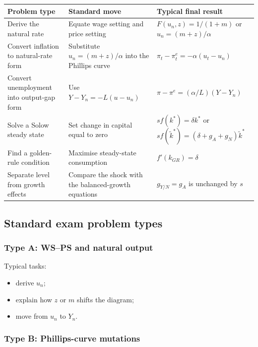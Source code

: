 \documentclass[12pt]{article}
\begin{document}
\begin{center}
\renewcommand{\arraystretch}{1.2}
\begin{tabularx}{\textwidth}{|p{3.3cm}|X|X|}
\hline
\textbf{Problem type} & \textbf{Standard move} & \textbf{Typical final result} \\
\hline
Derive the natural rate & Equate wage setting and price setting & \(F(u_n,z)=1/(1+m)\) or \(u_n=(m+z)/\alpha\) \\
\hline
Convert inflation to natural-rate form & Substitute \(u_n=(m+z)/\alpha\) into the Phillips curve & \(\pi_t-\pi_t^e=-\alpha(u_t-u_n)\) \\
\hline
Convert unemployment into output-gap form & Use \(Y-Y_n=-L(u-u_n)\) & \(\pi-\pi^e=(\alpha/L)(Y-Y_n)\) \\
\hline
Solve a Solow steady state & Set change in capital equal to zero & \(s f(k^*)=\delta k^*\) or \(s f(\tilde{k}^*)=(\delta+g_A+g_N)\tilde{k}^*\) \\
\hline
Find a golden-rule condition & Maximise steady-state consumption & \(f'(k_{GR})=\delta\) \\
\hline
Separate level from growth effects & Compare the shock with the balanced-growth equations & \(g_{Y/N}=g_A\) is unchanged by \(s\) \\
\hline
\end{tabularx}
\end{center}

\subsection{Standard exam problem types}

\subsubsection*{Type A: WS--PS and natural output}

Typical tasks:
\begin{itemize}[leftmargin=1.5em]
\item derive \(u_n\);
\item explain how \(z\) or \(m\) shifts the diagram;
\item move from \(u_n\) to \(Y_n\).
\end{itemize}

\subsubsection*{Type B: Phillips-curve mutations}
\end{document}
